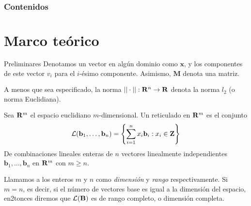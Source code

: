 


\frame{\titlepage}

\begin{frame}
\frametitle{Contenidos}
\tableofcontents
\end{frame}

\section{Marco teórico}


\begin{frame}{Preliminares}
Denotamos un vector en algún dominio como $\mathbf x$, y los componentes de este vector $v_i$ para el $i$-ésimo componente. Asimismo, $\mathbf M$ denota una matriz.

A menos que sea especificado, la norma $||\cdot ||: \mathbf{R}^n \to \mathbf{R}$ denota la norma $l_2$ (o norma Euclidiana).

\end{frame}

\begin{frame}
\begin{definition}[Reticulado]
Sea $\mathbf{R}^m$ el espacio euclidiano $m$-dimensional. Un reticulado en $\mathbf{R}^m$ es el conjunto
\[
\mathcal L(\mathbf{b}_1, \dots, \mathbf{b}_n) = \left\{\sum_{i = 1}^n x_i \mathbf{b}_i : x_i  \in \mathbf{Z}\right\}
\]
De combinaciones lineales enteras de $n$ vectores linealmente independientes $\mathbf{b}_1, ..., \mathbf{b}_n$ en $\mathbf{R}^m$ con $m \geq n$.
\end{definition}
Llamamos a los enteros $m$ y $n$ como {\it dimensión} y {\it rango} respectivamente. Si $m = n$, es decir, si el número de vectores base es igual a la dimensión del espacio, en2tonces diremos que $\mathcal{L}(\mathbf{B})$ es de rango completo, o dimensión completa.
\end{frame}

